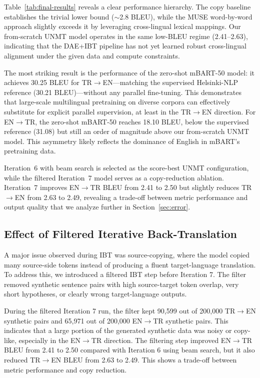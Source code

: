 \documentclass[runningheads]{llncs}
\begin{document}
Table~\ref{tab:final-results} reveals a clear performance hierarchy. The copy baseline establishes the trivial lower bound ($\sim$2.8 BLEU), while the MUSE word-by-word approach slightly exceeds it by leveraging cross-lingual lexical mappings. Our from-scratch UNMT model operates in the same low-BLEU regime (2.41--2.63), indicating that the DAE+IBT pipeline has not yet learned robust cross-lingual alignment under the given data and compute constraints.

The most striking result is the performance of the zero-shot mBART-50 model: it achieves 30.25 BLEU for TR$\rightarrow$EN---matching the supervised Helsinki-NLP reference (30.21 BLEU)---without any parallel fine-tuning. This demonstrates that large-scale multilingual pretraining on diverse corpora can effectively substitute for explicit parallel supervision, at least in the TR$\rightarrow$EN direction. For EN$\rightarrow$TR, the zero-shot mBART-50 reaches 18.10 BLEU, below the supervised reference (31.08) but still an order of magnitude above our from-scratch UNMT model. This asymmetry likely reflects the dominance of English in mBART's pretraining data.

Iteration~6 with beam search is selected as the score-best UNMT configuration, while the filtered Iteration~7 model serves as a copy-reduction ablation. Iteration~7 improves EN$\rightarrow$TR BLEU from 2.41 to 2.50 but slightly reduces TR$\rightarrow$EN from 2.63 to 2.49, revealing a trade-off between metric performance and output quality that we analyze further in Section~\ref{sec:error}.

\subsection{Effect of Filtered Iterative Back-Translation}

A major issue observed during IBT was source-copying, where the model copied many source-side tokens instead of producing a fluent target-language translation. To address this, we introduced a filtered IBT step before Iteration 7. The filter removed synthetic sentence pairs with high source-target token overlap, very short hypotheses, or clearly wrong target-language outputs.

During the filtered Iteration 7 run, the filter kept 90,599 out of 200,000 TR$\rightarrow$EN synthetic pairs and 65,971 out of 200,000 EN$\rightarrow$TR synthetic pairs. This indicates that a large portion of the generated synthetic data was noisy or copy-like, especially in the EN$\rightarrow$TR direction. The filtering step improved EN$\rightarrow$TR BLEU from 2.41 to 2.50 compared with Iteration 6 using beam search, but it also reduced TR$\rightarrow$EN BLEU from 2.63 to 2.49. This shows a trade-off between metric performance and copy reduction.
\end{document}

